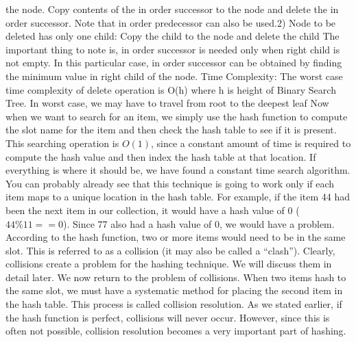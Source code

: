 \documentclass{article}
\begin{document}
the node. Copy contents of the in order successor to
the node and delete the in order successor. Note that
in order predecessor can also be used.2) Node to be
deleted has only one child: Copy the child to the node
and delete the child The important thing to note is, in
order successor is needed only when right child is not
empty. In this particular case, in order successor can
be obtained by finding the minimum value in right
child of the node. Time Complexity: The worst case
time complexity of delete operation is O(h) where h is
height of Binary Search Tree. In worst case, we may
have to travel from root to the deepest leaf Now when
we want to search for an item, we simply use the hash
function to compute the slot name for the item and
then check the hash table to see if it is present. This
searching operation is \(O(1)\), since a constant
amount of time is required to compute the hash value
and then index the hash table at that location. If
everything is where it should be, we have found a
constant time search algorithm.
You can probably already see that this technique is
going to work only if each item maps to a unique
location in the hash table. For example, if the item 44
had been the next item in our collection, it would have
a hash value of 0 (\(44 \% 11 == 0\)). Since 77 also
had a hash value of 0, we would have a problem.
According to the hash function, two or more items
would need to be in the same slot. This is referred to
as a collision (it may also be called a “clash”).
Clearly, collisions create a problem for the hashing
technique. We will discuss them in detail later. We
now return to the problem of collisions. When two
items hash to the same slot, we must have a
systematic method for placing the second item in the
hash table. This process is called collision resolution.
As we stated earlier, if the hash function is perfect,
collisions will never occur. However, since this is
often not possible, collision resolution becomes a very
important part of hashing. 
\end{document}
